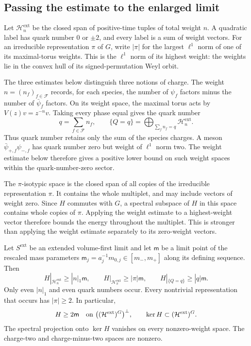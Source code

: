 \documentclass[11pt,letterpaper,reqno]{amsart}
\makeatletter
\theoremstyle{definition}
\newcommand{\ms@majorstart}{%
  \pushQED{\qed}\renewcommand{\qedsymbol}{$\blacksquare\square$}}
\newenvironment{theorem}[1][]{\ms@majorstart\ms@theorem[#1]}
  {\popQED\endms@theorem}
\theoremstyle{remark}
\makeatother
\begin{document}
\subsection{Passing the estimate to the enlarged limit}

Let $\mathcal H_n^{\mathrm{ext}}$ be the closed span
of positive-time tuples of total weight $n$. A
quadratic label has quark number $0$ or $\pm2$,
and every label is a sum of weight vectors.
For an irreducible representation $\pi$ of $G$,
write $|\pi|$ for the largest $\ell^1$ norm of
one of its maximal-torus weights. This is the
$\ell^1$ norm of its highest weight: the weights
lie in the convex hull of its signed-permutation
Weyl orbit.

The three estimates below distinguish three notions of
charge. The weight $n=(n_f)_{f\in\mathcal F}$ records,
for each species, the number of $\psi_f$ factors minus
the number of $\bar\psi_f$ factors. On its weight space,
the maximal torus acts by $V(z)v=z^{-n}v$. Taking every
phase equal gives the quark number
\[
 q=\sum_{f\in\mathcal F}n_f,\qquad
 \{Q=q\}=\mathop{\bigoplus}_{\sum_fn_f=q}
                              \mathcal H_n^{\mathrm{ext}}.
\]
Thus quark number retains only the sum of the species
charges. A meson $\bar\psi_{+,f}\psi_{-,f}$ has quark
number zero but weight of $\ell^1$ norm two. The weight
estimate below therefore gives a positive lower bound
on such weight spaces within the quark-number-zero sector.

The $\pi$-isotypic space is the closed span of all
copies of the irreducible representation $\pi$.
It contains the whole multiplet, and may include
vectors of weight zero. Since $H$ commutes with $G$,
a spectral subspace of $H$ in this space contains
whole copies of $\pi$. Applying the weight estimate
to a highest-weight vector therefore bounds the
energy throughout the multiplet. This is stronger
than applying the weight estimate separately to its
zero-weight vectors.


\begin{theorem}[Energy and internal charges]\label{C-400-34}
Let $S^{\mathrm{ext}}$ be an extended volume-first
limit and let $\mathsf m$ be a limit point of the
rescaled mass parameters
$\mathsf m_j=a_j^{-1}m_{0,j}\in[m_-,m_+]$
along its defining sequence.
Then
\[
 H|_{\mathcal H_n^{\mathrm{ext}}}\ge|n|_1\mathsf m,
 \qquad
 H|_{\mathcal H_\pi^{\mathrm{ext}}}\ge|\pi|\mathsf m,
 \qquad
 H|_{\{Q=q\}}\ge|q|\mathsf m.
\]
Only even $|n|_1$ and even quark numbers occur.
Every nontrivial representation that occurs has
$|\pi|\ge2$. In particular,
\[
 H\ge2\mathsf m\quad\hbox{on }\bigl((\mathcal H^{\mathrm{ext}})^G\bigr)^\perp,
 \qquad \ker H\subset(\mathcal H^{\mathrm{ext}})^G.
\]
The spectral projection onto $\ker H$ vanishes on
every nonzero-weight space. The charge-two and
charge-minus-two spaces are nonzero.
\end{theorem}
\end{document}
